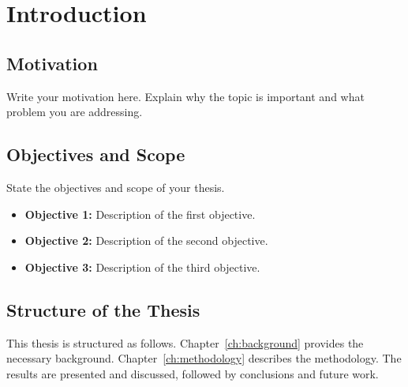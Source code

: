 \section{Introduction}

\subsection{Motivation}

Write your motivation here. Explain why the topic is important and what
problem you are addressing.

\subsection{Objectives and Scope}

State the objectives and scope of your thesis.

\begin{itemize}
    \item \textbf{Objective 1:} Description of the first objective.

    \item \textbf{Objective 2:} Description of the second objective.

    \item \textbf{Objective 3:} Description of the third objective.
\end{itemize}

\subsection{Structure of the Thesis}

This thesis is structured as follows. Chapter~\ref{ch:background} provides
the necessary background. Chapter~\ref{ch:methodology} describes the
methodology. The results are presented and discussed, followed by
conclusions and future work.
